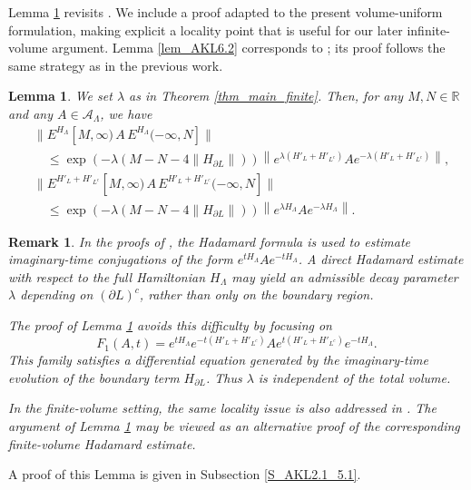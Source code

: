 \documentclass[11pt]{article}
\numberwithin{equation}{section}
\newtheorem{lemma}[theorem]{Lemma}
\newtheorem{remark}[theorem]{Remark}
\begin{document}
Lemma \ref{lem_AKL2.1_5.1} revisits \cite[Theorems 2.1 and 5.1]{Arad-Kuwahara-Landau 2016}. We include a proof adapted to the present volume-uniform formulation, making explicit a locality point that is useful for our later infinite-volume argument. Lemma \ref{lem_AKL6.2} corresponds to \cite[Lemma 6.2]{Arad-Kuwahara-Landau 2016}; its proof follows the same strategy as in the previous work.

\begin{lemma}\label{lem_AKL2.1_5.1}
We set $\lambda$ as in Theorem \ref{thm_main_finite}. Then, for any $M,N\in\mathbb{R}$ and any $A\in\mathcal{A}_\Lambda$, we have
\begin{align*}
&\|E^{H_\Lambda}[M,\infty) \,A\, E^{H_\Lambda}(-\infty,N]\|\\
&\quad\leq \exp(-\lambda(M-N-4\|H_{\partial L}\|)) \left\|e^{\lambda(H'_L+H'_{L^c})}Ae^{-\lambda(H'_L+H'_{L^c})}\right\|,\\
&\|E^{H'_L+H'_{L^c}}[M,\infty) \,A\, E^{H'_L+H'_{L^c}}(-\infty,N]\|\\
&\quad\leq \exp(-\lambda(M-N-4\|H_{\partial L}\|)) \left\|e^{\lambda H_\Lambda}Ae^{-\lambda H_\Lambda}\right\|.
\end{align*}
\end{lemma}

\begin{remark}\label{rmk_hadamard_finite}
In the proofs of \cite[Theorems 2.1 and 5.1]{Arad-Kuwahara-Landau 2016}, the Hadamard formula is used to estimate imaginary-time conjugations of the form $e^{tH_\Lambda}Ae^{-tH_\Lambda}$. A direct Hadamard estimate with respect to the full Hamiltonian $H_\Lambda$ may yield an admissible decay parameter $\lambda$ depending on $(\partial L)^c$, rather than only on the boundary region.

The proof of Lemma \ref{lem_AKL2.1_5.1} avoids this difficulty by focusing on
\[
F_1(A,t)=e^{tH_\Lambda}e^{-t(H'_L+H'_{L^c})}A e^{t(H'_L+H'_{L^c})}e^{-tH_\Lambda}.
\]
This family satisfies a differential equation generated by the imaginary-time evolution of the boundary term $H_{\partial L}$. Thus $\lambda$ is independent of the total volume.

In the finite-volume setting, the same locality issue is also addressed in \cite[Supplementary Lemma 17]{Kuwahara-Saito2020}. The argument of Lemma \ref{lem_AKL2.1_5.1} may be viewed as an alternative proof of the corresponding finite-volume Hadamard estimate.
\end{remark}

A proof of this Lemma is given in Subsection \ref{S_AKL2.1_5.1}.
\end{document}
